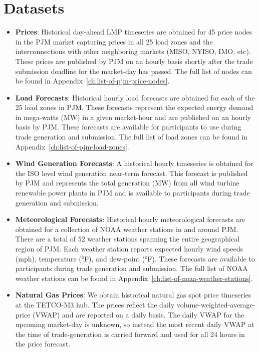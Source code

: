 \section{Datasets}\label{sec:datasets}

\begin{itemize}
    \item \textbf{Prices}: Historical day-ahead LMP timeseries are obtained for 45 price nodes in the PJM market
    capturing prices in all 25 load zones and the interconnections with other neighboring markets (MISO, NYISO, IMO, etc).
    These prices are published by PJM on an hourly basis shortly after the trade submission deadline for the market-day has passed.
    The full list of nodes can be found in Appendix~\ref{ch:list-of-pjm-price-nodes}.

    \item \textbf{Load Forecasts}: Historical hourly load forecasts are obtained for each of the 25 load zones in PJM\@.
    These forecasts represent the expected energy demand in mega-watts (MW) in a given market-hour and are published on
    an hourly basis by PJM\@.
    These forecasts are available for participants to use during trade generation and submission.
    The full list of load zones can be found in Appendix~\ref{ch:list-of-pjm-load-zones}.

    \item \textbf{Wind Generation Forecasts}: A historical hourly timeseries is obtained for the ISO level wind generation
    near-term forecast.
    This forecast is published by PJM and represents the total generation (MW) from all wind turbine renewable power
    plants in PJM and is available to participants during trade generation and submission.

    \item \textbf{Meteorological Forecasts}: Historical hourly meteorological forecasts are obtained for a collection
    of NOAA weather stations in and around PJM\@.
    There are a total of 52 weather stations spanning the entire geographical region of PJM\@.
    Each weather station reports expected hourly wind speeds (mph), temperature (°F), and dew-point (°F).
    These forecasts are available to participants during trade generation and submission.
    The full list of NOAA weather stations can be found in Appendix~\ref{ch:list-of-noaa-weather-stations}.

    \item \textbf{Natural Gas Prices}: We obtain historical natural gas spot price timeseries at the TETCO-M3 hub.
    The prices reflect the daily volume-weighted-average-price (VWAP) and are reported on a daily basis.
    The daily VWAP for the upcoming market-day is unknown, so instead the most recent daily VWAP at the time of
    trade-generation is carried forward and used for all 24 hours in the price forecast.
\end{itemize}

